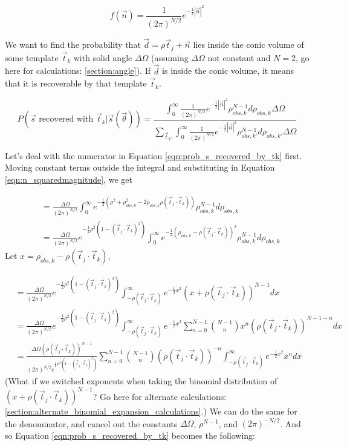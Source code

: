 \documentclass[12pt]{article}
\newcommand{\ptjtk}{\rho(\vec{t}_j\cdot\vec{t}_k)}
\begin{document}
   \begin{equation}
   f(\vec{n}) = \frac{1}{(2\pi)^{N/2}}e^{-\frac{1}{2}|\vec{n}|^2}
   \end{equation}

We want to find the probability that $\vec{d}=\rho\vec{t}_j+\vec{n}$ lies inside the conic volume of some template $\vec{t}_k$ with solid angle $\Delta\Omega$ (assuming $\Delta\Omega$ not constant and $N=2$, go here for calculations: \ref{section:angle}). If $\vec{d}$ is inside the conic volume, it means that it is recoverable by that template $\vec{t}_k$.

   \begin{equation}
   P(\text{$\vec{s}$ recovered with $\vec{t}_k$}|\vec{s}(\vec\theta)) = \frac{\int_0^\infty \frac{1}{(2\pi)^{N/2}} e^{-\frac{1}{2} |\vec{n}|^2} {\rho^{N-1}_{obs,k}} d\rho_{obs,k} \Delta\Omega}
   {\sum_{\vec{t}_{k'}} \int_0^\infty \frac{1}{(2\pi)^{N/2}} e^{-\frac{1}{2} |\vec{n}|^2} {\rho^{N-1}_{obs,k'}} d\rho_{obs,k'} \Delta\Omega}
   \label{eqn:prob_s_recovered_by_tk}
   \end{equation}

Let's deal with the numerator in Equation \ref{eqn:prob_s_recovered_by_tk} first. Moving constant terms outside the integral and substituting in Equation \ref{eqn:n_squaredmagnitude}, we get

   \begin{align}
   &= \frac{\Delta\Omega}{(2\pi)^{N/2}} \int_0^\infty  e^{-\frac{1}{2}( \rho^2 + \rho_{obs,k}^2 - 2\rho_{obs,k}\ptjtk)  } {\rho^{N-1}_{obs,k}} d\rho_{obs,k} \\
  &= \frac{\Delta\Omega}{(2\pi)^{N/2}} e^{-\frac{1}{2}\rho^2(1-(\vec{t}_j\cdot\vec{t}_k)^2)} \int_0^\infty  e^{-\frac{1}{2} (\rho_{obs,k} - \ptjtk)^2  } {\rho^{N-1}_{obs,k}} d\rho_{obs,k}
   \end{align}
Let $x = \rho_{obs,k} - \ptjtk$,

   \begin{align}
   &= \frac{\Delta\Omega}{(2\pi)^{N/2}} e^{-\frac{1}{2}\rho^2(1-(\vec{t}_j\cdot\vec{t}_k)^2)} \int_{-\ptjtk}^\infty  e^{-\frac{1}{2} x^2  } {(x+\ptjtk)^{N-1}} dx \\
   &= \frac{\Delta\Omega}{(2\pi)^{N/2}} e^{-\frac{1}{2}\rho^2(1-(\vec{t}_j\cdot\vec{t}_k)^2)} \int_{-\ptjtk}^\infty  e^{-\frac{1}{2} x^2  } {\sum_{n=0}^{N-1} \binom{N-1}{n}x^n(\ptjtk)^{N-1-n} } dx \\
   &= \frac{\Delta\Omega(\ptjtk)^{N-1}}{(2\pi)^{N/2}  e^{\frac{1}{2}\rho^2(1-(\vec{t}_j\cdot\vec{t}_k)^2)}}  \sum_{n=0}^{N-1} \binom{N-1}{n} (\ptjtk)^{-n} \int_{-\ptjtk}^\infty e^{-\frac{1}{2} x^2  } x^n  dx
   \end{align}
(What if we switched exponents when taking the binomial distribution of $(x+\ptjtk)^{N-1}$? Go here for alternate calculations: \ref{section:alternate_binomial_expansion_calculations}.)
We can do the same for the denominator, and cancel out the constants $\Delta\Omega$, $\rho^{N-1}$, and $(2\pi)^{-N/2}$. And so Equation \ref{eqn:prob_s_recovered_by_tk} becomes the following:
   
\end{document}
